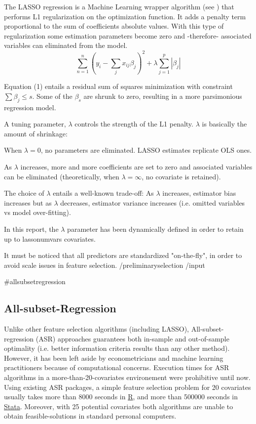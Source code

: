 \documentclass{article}
\begin{document}
The LASSO regression is a Machine Learning wrapper algorithm (see \cite{chandrashekar2014}) that performs L1 regularization on the optimization function. It adds a penalty term proportional to the sum of coefficients absolute values. With this type of regularization some estimation parameters become zero and -therefore- associated variables can eliminated from the model.
\begin{equation}
    \sum_{n=1}^{n}(y_i - \sum_{j}x_{ij}\beta_{j})^2 + \lambda \sum_{j=1}^p|\beta_{j}|
\end{equation}

Equation (1) entails a residual sum of squares minimization with constraint $\sum \beta_{j}\leq s$. Some of the $\beta_s$ are shrunk to zero, resulting in a more parsimonious regression model.

A tuning parameter, $\lambda$ controls the strength of the L1 penalty. $\lambda$ is basically the amount of shrinkage:

When $ \lambda = 0$, no parameters are eliminated. LASSO estimates replicate OLS ones.

As $\lambda$ increases, more and more coefficients are set to zero and associated variables can be eliminated (theoretically, when $\lambda = \infty$, no covariate is retained).

The choice of $\lambda$ entails a well-known trade-off:  As $\lambda$ increases, estimator bias increases but as $\lambda$ decreases, estimator variance increases (i.e. omitted variables vs model over-fitting).

In this report, the $\lambda$ parameter has been dynamically defined in order to retain up to {{lassonumvars}} covariates.

It must be noticed that all predictors are standardized "on-the-fly", in order to avoid scale issues in feature selection.
{{/preliminaryselection}}
{{/input}}

{{#allsubsetregression}}
\subsection{All-subset-Regression}
Unlike other feature selection algorithms (including LASSO), All-subset-regression (ASR) approaches guarantees both in-sample and out-of-sample optimality (i.e. better information criteria results than any other method). However, it has been left aside by econometricians and machine learning practitioners because of computational concerns. Execution times for ASR algorithms in a more-than-20-covariates environement were prohibitive until now. Using existing ASR packages, a simple feature selection problem for 20 covariates usually takes more than 8000 seconds in 
\href{https://cran.r-project.org/web/packages/MuMIn/MuMIn.pdf}{R}, and more than 500000 seconds in \href{https://ideas.repec.org/c/boc/bocode/s457737.html#download}{Stata}. Moreover, with 25 potential covariates both algorithms are unable to obtain feasible-solutions in standard personal computers.
\end{document}
